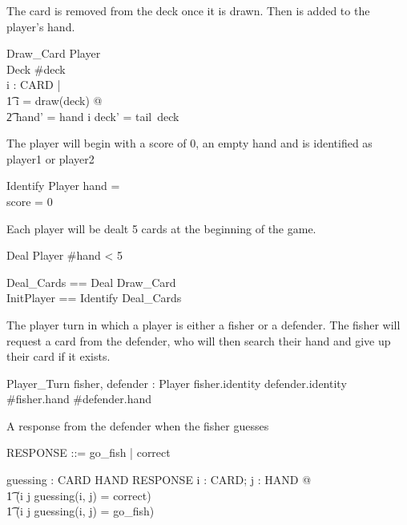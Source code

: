 \documentclass{article}
\begin{document}
The card is removed from the deck once it is drawn. Then is added to the player's hand.
\begin{schema}{Draw\_Card}
    \Delta Player \\
    \Delta Deck
    \where
    \#deck  \\
    \forall i : \power CARD | \\
    \t1 i = draw(deck) @ \\
    \t2 hand' = hand \cup i \land deck' = tail~deck
\end{schema}

The player will begin with a score of 0, an empty hand
and is identified as player1 or player2
\begin{schema}{Identify}
    Player
    \where
    hand = \emptyset \\
    score = 0
\end{schema}

Each player will be dealt 5 cards at the beginning of the game.
\begin{schema}{Deal}
    \Xi Player
    \where
    \#hand < 5
\end{schema}

\begin{zed}
    Deal\_Cards == Deal \land Draw\_Card\\
    InitPlayer == Identify \semi Deal\_Cards
\end{zed}

The player turn in which a player is either a fisher
or a defender. The fisher will request a card from the defender,
who will then search their hand and give up their card if it exists.
\begin{schema}{Player\_Turn}
    fisher, defender : Player
    \where
    fisher.identity \neq defender.identity\\
    \#fisher.hand  \land \#defender.hand 
\end{schema}

A response from the defender when the fisher guesses
\begin{zed}
RESPONSE ::= go\_fish | correct
\end{zed}

\begin{axdef}
    guessing : CARD \cross HAND \fun RESPONSE
    \where
    \forall i : CARD; j : HAND @ \\
    \t1 (i \in j \iff guessing(i, j) = correct) \lor \\
    \t1 (i \notin j \iff guessing(i, j) = go\_fish)
\end{axdef}
\end{document}
